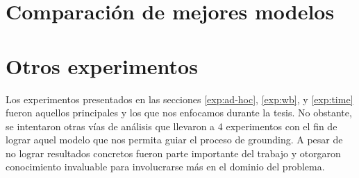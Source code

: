 \section{Comparación de mejores modelos}
\label{results:comparison}

% 
% 
% 
% 

\section{Otros experimentos}

Los experimentos presentados en las secciones \ref{exp:ad-hoc}, \ref{exp:wb}, y
\ref{exp:time} fueron aquellos principales y los que nos enfocamos durante la
tesis. No obstante, se intentaron otras vías de análisis que llevaron a 4
experimentos con el fin de lograr aquel modelo que nos permita guiar el proceso
de grounding. A pesar de no lograr resultados concretos fueron parte importante
del trabajo y otorgaron conocimiento invaluable para involucrarse más en el
dominio del problema.


